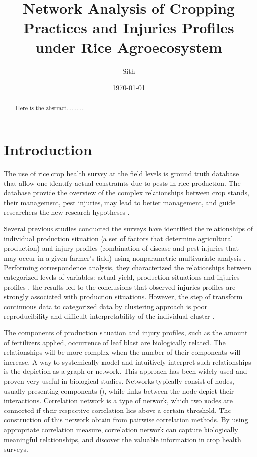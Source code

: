 \documentclass[a4paper]{article}
\title{Network Analysis of Cropping Practices and Injuries Profiles under Rice Agroecosystem}
\author{Sith}
\date{\today}
\begin{document}
\maketitle

\begin{abstract}
Here is the abstract...........
\end{abstract}

\section*{Introduction}
The use of rice crop health survey at the field levels is ground truth database that allow one identify actual constraints due to pests in rice production. The database provide the overview of the complex relationships between crop stands, their management, pest injuries, may lead to better management, and guide researchers the new research hypotheses \citep{mew:2004kh, Savary:2006to}. 

Several previous studies \citep{Savary:2000char, savary2000quanti, savary2005multiple, dong2010characterization, Reddy:2011hl} conducted the surveys have identified the relationships of individual production situation (a set of factors that determine agricultural production) and injury profiles (combination of disease and pest injuries that may occur in a given farmer’s field) using nonparametric multivariate analysis \citep{savary1997new}. Performing correspondence analysis, they characterized the relationships between categorized levels of variables: actual yield, production situations  and injuries profiles . the results led to the conclusions that observed injuries profiles are strongly associated with production situations\citep{mew:2004kh}. However, the step of transform continuous data to categorized data by clustering approach is poor reproducibility and difficult interpretability of the individual cluster \citep{jiang2004cluster, avelino:2006ie}.   

The components of production situation and injury profiles, such as the amount of fertilizers applied, occurrence of leaf blast are biologically related. The relationships will be more complex when the number of their components will increase. A way to systemically model and intuitively interpret such relationships is the depiction as a graph or network. This approach has been widely used and proven very useful in biological studies. Networks typically consist of nodes, usually presenting components (), while links between the node depict their interactions. Correlation network is a type of network, which two nodes are connected if their respective correlation lies above a certain threshold. The construction of this network obtain from pairwise correlation methods. By using appropriate correlation measure, correlation network can capture biologically meaningful relationships, and discover the valuable information in crop health surveys.
\end{document}
